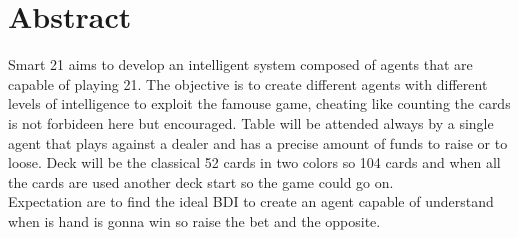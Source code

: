 \chapter*{\center \Large  Abstract}

Smart 21 aims to develop an intelligent system composed of agents that are capable of playing 21. The objective is to create different agents with different levels of intelligence to exploit the famouse game, cheating like counting the cards is not forbideen here but encouraged. Table will be attended always by a single agent that plays against a dealer and has a precise amount of funds to raise or to loose. Deck will be the classical 52 cards in two colors so 104 cards and when all the cards are used another deck start so the game could go on.
~\\[0.8cm]%
Expectation are to find the ideal BDI to create an agent capable of understand when is hand is gonna win so raise the bet and the opposite. 






